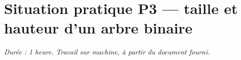 \section*{Situation pratique P3 --- taille et hauteur d'un arbre binaire}

\textit{Durée : 1 heure. Travail sur machine, à partir du document fourni.}

